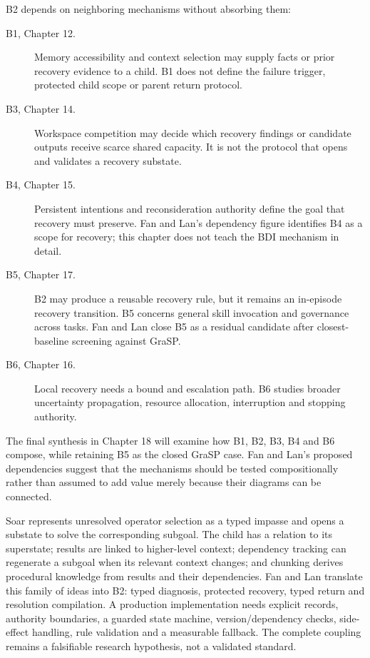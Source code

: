 B2 depends on neighboring mechanisms without absorbing them:

\begin{description}
  \item[B1, Chapter 12.] Memory accessibility and context selection may supply facts or prior recovery evidence to a child. B1 does not define the failure trigger, protected child scope or parent return protocol.
  \item[B3, Chapter 14.] Workspace competition may decide which recovery findings or candidate outputs receive scarce shared capacity. It is not the protocol that opens and validates a recovery substate.
  \item[B4, Chapter 15.] Persistent intentions and reconsideration authority define the goal that recovery must preserve. Fan and Lan's dependency figure identifies B4 as a scope for recovery; this chapter does not teach the BDI mechanism in detail.
  \item[B5, Chapter 17.] B2 may produce a reusable recovery rule, but it remains an in-episode recovery transition. B5 concerns general skill invocation and governance across tasks. Fan and Lan close B5 as a residual candidate after closest-baseline screening against GraSP.
  \item[B6, Chapter 16.] Local recovery needs a bound and escalation path. B6 studies broader uncertainty propagation, resource allocation, interruption and stopping authority.
\end{description}

The final synthesis in Chapter 18 will examine how B1, B2, B3, B4 and B6 compose, while retaining B5 as the closed GraSP case. Fan and Lan's proposed dependencies suggest that the mechanisms should be tested compositionally rather than assumed to add value merely because their diagrams can be connected.

\begin{chapterrecap}
Soar represents unresolved operator selection as a typed impasse and opens a substate to solve the corresponding subgoal. The child has a relation to its superstate; results are linked to higher-level context; dependency tracking can regenerate a subgoal when its relevant context changes; and chunking derives procedural knowledge from results and their dependencies. Fan and Lan translate this family of ideas into B2: typed diagnosis, protected recovery, typed return and resolution compilation. A production implementation needs explicit records, authority boundaries, a guarded state machine, version/dependency checks, side-effect handling, rule validation and a measurable fallback. The complete coupling remains a falsifiable research hypothesis, not a validated standard.
\end{chapterrecap}

